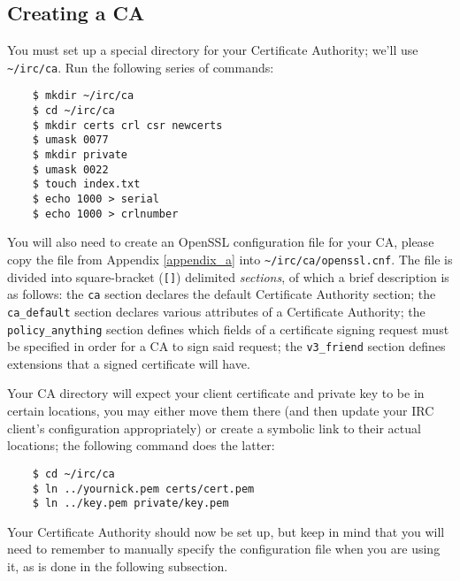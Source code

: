\documentclass{article}
\begin{document}
{\subsection{Creating a CA}
You must set up a special directory for your Certificate Authority; we'll use \texttt{\textasciitilde /irc/ca}.  Run the following series of commands:
\begin{lstlisting}
    $ mkdir ~/irc/ca
    $ cd ~/irc/ca
    $ mkdir certs crl csr newcerts
    $ umask 0077
    $ mkdir private
    $ umask 0022
    $ touch index.txt
    $ echo 1000 > serial
    $ echo 1000 > crlnumber
\end{lstlisting}
You will also need to create an OpenSSL configuration file for your CA, please copy the file from Appendix \ref{appendix_a} into \texttt{\textasciitilde /irc/ca/openssl.cnf}.  The file is divided into square-bracket (\texttt{[]}) delimited \textit{sections}, of which a brief description is as follows: the \texttt{ca} section declares the default Certificate Authority section; the \texttt{ca\_default} section declares various attributes of a Certificate Authority; the \texttt{policy\_anything} section defines which fields of a certificate signing request must be specified in order for a CA to sign said request;  the \texttt{v3\_friend} section defines extensions that a signed certificate will have.

Your CA directory will expect your client certificate and private key to be in certain locations, you may either move them there (and then update your IRC client's configuration appropriately) or create a symbolic link to their actual locations; the following command does the latter:
\begin{lstlisting}
    $ cd ~/irc/ca
    $ ln ../yournick.pem certs/cert.pem
    $ ln ../key.pem private/key.pem
\end{lstlisting}
Your Certificate Authority should now be set up, but keep in mind that you will need to remember to manually specify the configuration file when you are using it, as is done in the following subsection.

}
\end{document}
